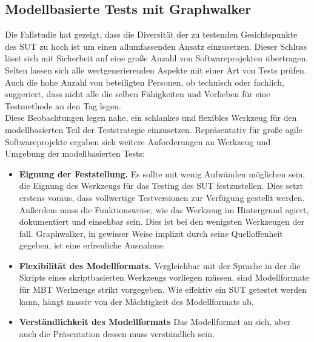 
\subsection{Modellbasierte Tests mit Graphwalker}
\label{sec:mbt_results}
Die Fallstudie hat gezeigt, dass die Diversität der zu testenden Gesichtspunkte des \Gls{SUT} zu hoch ist um einen allumfassenden Ansatz einzusetzen. Dieser Schluss lässt sich mit Sicherheit auf eine große Anzahl von Softwareprojekten übertragen. Selten lassen sich alle wertgenerierenden Aspekte mit einer Art von Tests prüfen. Auch die hohe Anzahl von beteiligten Personen, ob technisch oder fachlich, suggeriert, dass nicht alle die selben Fähigkeiten und Vorlieben für eine Testmethode an den Tag legen.\\
Diese Beobachtungen legen nahe, ein schlankes und flexibles Werkzeug für den modellbasierten Teil der Teststrategie einzusetzen. Repräsentativ für große agile Softwareprojekte ergaben sich weitere Anforderungen an Werkzeug und Umgebung der modellbasierten Tests:

\begin{itemize} 
\item\textbf{Eignung der Feststellung.} Es sollte mit wenig Aufwänden möglichen sein, die Eignung des Werkzeugs für das Testing des \Gls{SUT} festzustellen. Dies setzt erstens voraus, dass vollwertige Testversionen zur Verfügung gestellt werden. Außerdem muss die Funktionsweise, wie das Werkzeug im Hintergrund agiert, dokumentiert und einsehbar sein. Dies ist bei den wenigsten Werkzeugen der fall. Graphwalker, in gewisser Weise implizit durch seine Quelloffenheit gegeben, ist eine erfreuliche Ausnahme.
\item \textbf{Flexibilität des Modellformats.} Vergleichbar mit der Sprache in der die Skripts eines skriptbasierten Werkzeugs vorliegen müssen, sind Modellformate für \Gls{MBT} Werkzeuge strikt vorgegeben. Wie effektiv ein \Gls{SUT} getestet werden kann, hängt massiv von der Mächtigkeit des Modellformats ab.
\item \textbf{Verständlichkeit des Modellformats} Das Modellformat an sich, aber auch die Präsentation dessen muss verständlich sein.
\end{itemize}


